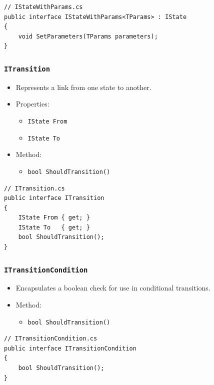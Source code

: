 \begin{verbatim}
// IStateWithParams.cs
public interface IStateWithParams<TParams> : IState
{
    void SetParameters(TParams parameters);
}
\end{verbatim}

\subsubsection{\texttt{ITransition}}
\begin{itemize}
  \item Represents a link from one state to another.
  \item Properties:
    \begin{itemize}
      \item \verb|IState From|  
      \item \verb|IState To|  
    \end{itemize}
  \item Method:
    \begin{itemize}
      \item \verb|bool ShouldTransition()|
    \end{itemize}
\end{itemize}

\begin{verbatim}
// ITransition.cs
public interface ITransition
{
    IState From { get; }
    IState To   { get; }
    bool ShouldTransition();
}
\end{verbatim}

\subsubsection{\texttt{ITransitionCondition}}
\begin{itemize}
  \item Encapsulates a boolean check for use in conditional transitions.
  \item Method:
    \begin{itemize}
      \item \verb|bool ShouldTransition()|
    \end{itemize}
\end{itemize}

\begin{verbatim}
// ITransitionCondition.cs
public interface ITransitionCondition
{
    bool ShouldTransition();
}
\end{verbatim}

